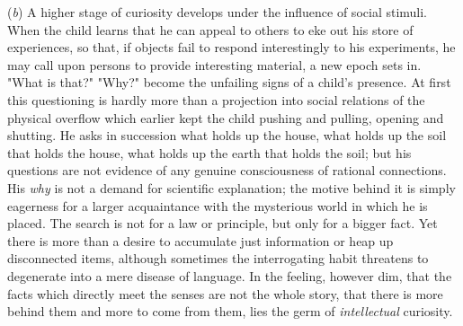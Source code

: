 \documentclass[showtrims,ustradepaper]{memoir}
\begin{document}
(\emph{b}) A higher stage of curiosity develops under the influence of
social stimuli. When the child learns that he can appeal to others to
eke out his store of experiences, so that, if objects fail to respond
interestingly to his experiments, he may call upon persons to provide
interesting material, a new epoch sets in. "What is that?" "Why?" become
the unfailing signs of a child's presence. At first this questioning is
hardly more than a projection into social relations of the physical
overflow which earlier kept the child pushing and pulling, opening and
shutting. He asks in succession what holds up the house, what holds up
the soil that holds the house, what holds up the earth that holds the
soil; but his questions are not evidence of any genuine consciousness of
rational connections. His \emph{why} is not a demand for scientific
explanation; the motive behind it is simply eagerness for a larger
acquaintance with the mysterious world in which he is placed. The search
is not for a law or principle, but only for a bigger fact. Yet there is
more than a desire to accumulate just information or heap up
disconnected items, although sometimes the interrogating habit threatens
to degenerate into a mere disease of language. In the feeling, however
dim, that the facts which directly meet the senses are not the whole
story, that there is more behind them and more to come from them, lies
the germ of \emph{intellectual} curiosity.

\end{document}
